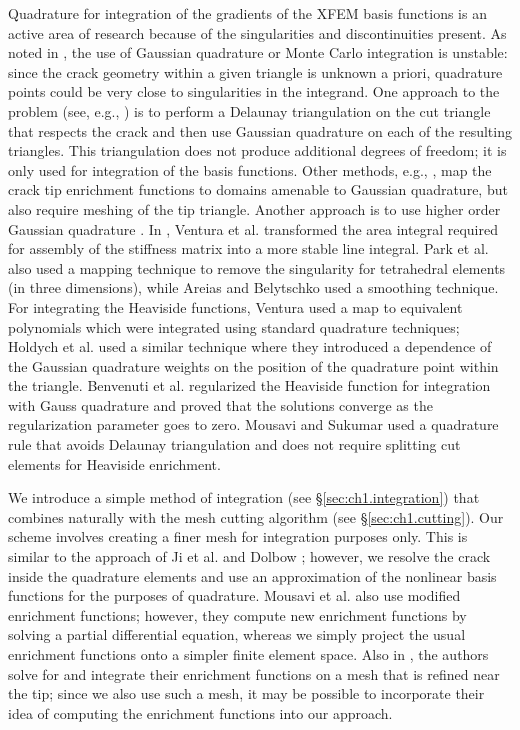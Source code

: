 Quadrature for integration of the gradients of the XFEM basis functions is an active area of research because of the singularities and discontinuities present. As noted in \cite{Daux00}, the use of Gaussian quadrature or Monte Carlo integration is unstable: since the crack geometry within a given triangle is unknown a priori, quadrature points could be very close to singularities in the integrand. One approach to the problem (see, e.g., \cite{Stazi03}) is to perform a Delaunay triangulation on the cut triangle that respects the crack and then use Gaussian quadrature on each of the resulting triangles. This triangulation does not produce additional degrees of freedom; it is only used for integration of the basis functions. Other methods, e.g., \cite{Bechet05, Laborde05}, map the crack tip enrichment functions to domains amenable to Gaussian quadrature, but also require meshing of the tip triangle. Another approach is to use higher order Gaussian quadrature \cite{Strouboulis00}. In \cite{Ventura09}, Ventura et al. transformed the area integral required for assembly of the stiffness matrix into a more stable line integral. Park et al. \cite{Park09} also used a mapping technique to remove the singularity for tetrahedral elements (in three dimensions), while Areias and Belytschko \cite{Areias05} used a smoothing technique. For integrating the Heaviside functions, Ventura \cite{Ventura06} used a map to equivalent polynomials which were integrated using standard quadrature techniques; Holdych et al. \cite{Holdych08} used a similar technique where they introduced a dependence of the Gaussian quadrature weights on the position of the quadrature point within the triangle. Benvenuti et al. \cite{Benvenuti08} regularized the Heaviside function for integration with Gauss quadrature and proved that the solutions converge as the regularization parameter goes to zero. Mousavi and Sukumar \cite{Mousavi10} used a quadrature rule that avoids Delaunay triangulation and does not require splitting cut elements for Heaviside enrichment. 

We introduce a simple method of integration (see \S\ref{sec:ch1.integration}) that combines naturally with the mesh cutting algorithm (see \S\ref{sec:ch1.cutting}). Our scheme involves creating a finer mesh for integration purposes only. This is similar to the approach of Ji et al. \cite{Ji.H02} and Dolbow \cite{Dolbow99}; however, we resolve the crack inside the quadrature elements and use an approximation of the nonlinear basis functions for the purposes of quadrature. Mousavi et al. \cite{Mousavi11} also use modified enrichment functions; however, they compute new enrichment functions by solving a partial differential equation, whereas we simply project the usual enrichment functions onto a simpler finite element space. Also in \cite{Mousavi11}, the authors solve for and integrate their enrichment functions on a mesh that is refined near the tip; since we also use such a mesh, it may be possible to incorporate their idea of computing the enrichment functions into our approach.

